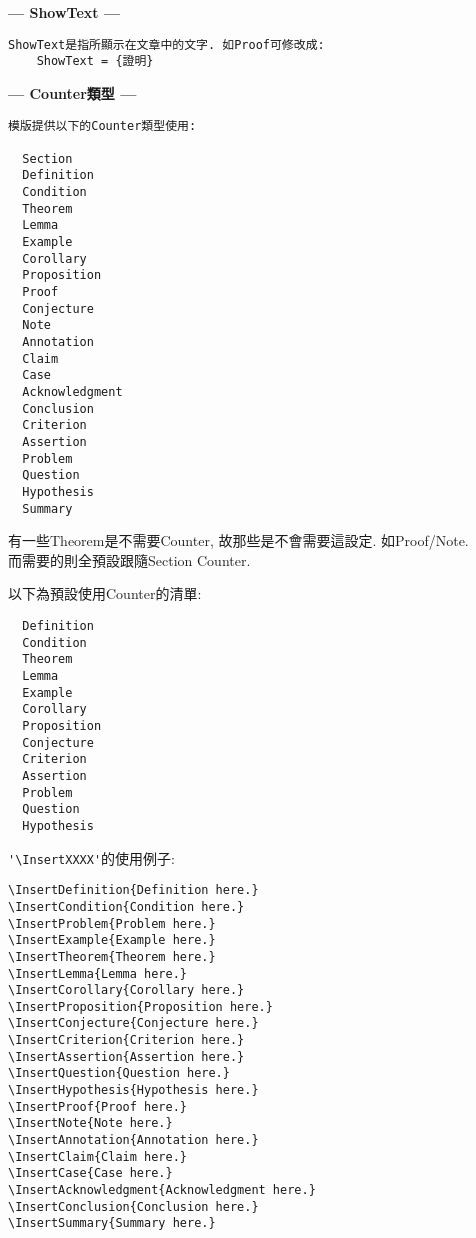 \begin{enumerate}
{    \textbf{--- ShowText ---}
    \begin{DescriptionFrame}
    \begin{verbatim}
ShowText是指所顯示在文章中的文字. 如Proof可修改成:
    ShowText = {證明}
    \end{verbatim}
    \end{DescriptionFrame}
  \newpage
    \textbf{--- Counter類型 ---}
    \begin{DescriptionFrame}
    \begin{verbatim}
模版提供以下的Counter類型使用:

  Section
  Definition
  Condition
  Theorem
  Lemma
  Example
  Corollary
  Proposition
  Proof
  Conjecture
  Note
  Annotation
  Claim
  Case
  Acknowledgment
  Conclusion
  Criterion
  Assertion
  Problem
  Question
  Hypothesis
  Summary
    \end{verbatim}
    \end{DescriptionFrame}

    \newpage
    有一些Theorem是不需要Counter, 故那些是不會需要這設定. 如Proof/Note.\\
    而需要的則全預設跟隨Section Counter.

    以下為預設使用Counter的清單:
    \begin{DescriptionFrame}
    \begin{verbatim}
  Definition
  Condition
  Theorem
  Lemma
  Example
  Corollary
  Proposition
  Conjecture
  Criterion
  Assertion
  Problem
  Question
  Hypothesis
    \end{verbatim}
    \end{DescriptionFrame}

  \newpage
    \verb|'\InsertXXXX'|的使用例子:
    \begin{DescriptionFrame}
    \begin{verbatim}
\InsertDefinition{Definition here.}
\InsertCondition{Condition here.}
\InsertProblem{Problem here.}
\InsertExample{Example here.}
\InsertTheorem{Theorem here.}
\InsertLemma{Lemma here.}
\InsertCorollary{Corollary here.}
\InsertProposition{Proposition here.}
\InsertConjecture{Conjecture here.}
\InsertCriterion{Criterion here.}
\InsertAssertion{Assertion here.}
\InsertQuestion{Question here.}
\InsertHypothesis{Hypothesis here.}
\InsertProof{Proof here.}
\InsertNote{Note here.}
\InsertAnnotation{Annotation here.}
\InsertClaim{Claim here.}
\InsertCase{Case here.}
\InsertAcknowledgment{Acknowledgment here.}
\InsertConclusion{Conclusion here.}
\InsertSummary{Summary here.}
    \end{verbatim}
    \end{DescriptionFrame}

}
\end{enumerate}
